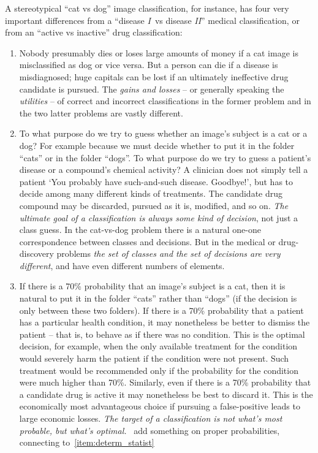 \documentclass[\ifafour a4paper,12pt,\else a5paper,10pt,\fi%
onecolumn,oneside,article,%
british%
]{memoir}
\theoremstyle{remark}
\theoremstyle{innote}
\newcommand*{\pencil}{{\fontencoding{U}\fontfamily{fontawesometwo}\selectfont\symbol{210}}}
\newcommand{\mynotep}[1]{{\footnotesize\color{notecolour}\pencil\ #1}}
\renewcommand*{\|}[1][]{\nonscript\:#1\vert\nonscript\:\mathopen{}}
\newcommand*{\tI}{\textit{I}}
\newcommand*{\tII}{\textit{II}}
\begin{document}
A stereotypical \enquote{cat vs dog} image classification, for instance, has four very important differences from a \enquote{disease \tI\ vs disease \tII} medical classification, or from an \enquote{active vs inactive} drug classification:
\begin{enumerate}[label=(\roman*),wide]

\item\label{item:gain_loss}Nobody presumably dies or loses large amounts of money if a cat image is misclassified as dog or vice versa. But a person can die if a disease is misdiagnosed; huge capitals can be lost if an ultimately ineffective drug candidate is pursued. The \emph{gains and losses} -- or generally speaking the \emph{utilities} -- of correct and incorrect classifications in the former problem and in the two latter problems are vastly different.

\item\label{item:decisions_classes} To what purpose do we try to guess whether an image's subject is a cat or a dog? For example because we must decide whether to put it in the folder \enquote{cats} or in the folder \enquote{dogs}. To what purpose do we try to guess a patient's disease or a compound's chemical activity? A clinician does not simply tell a patient \enquote*{You probably have such-and-such disease. Goodbye!}, but has to decide among many different kinds of treatments. The candidate drug compound may be discarded, pursued as it is, modified, and so on. \emph{The ultimate goal of a classification is always some kind of decision}, not just a class guess. In the cat-vs-dog problem there is a natural one-one correspondence between classes and decisions. But in the medical or drug-discovery problems \emph{the set of classes and the set of decisions are very different}, and have even different numbers of elements.

\item\label{item:optimal_truth} If there is a 70\% probability that an image's subject is a cat, then it is natural to put it in the folder \enquote{cats} rather than \enquote{dogs} (if the decision is only between these two folders). If there is a 70\% probability that a patient has a particular health condition, it may nonetheless be better to dismiss the patient -- that is, to behave as if there was no condition. This is the optimal decision, for example, when the only available treatment for the condition would severely harm the patient if the condition were not present. Such treatment would be recommended only if the probability for the condition were much higher than 70\%. Similarly, even if there is a 70\% probability that a candidate drug is active it may nonetheless be best to discard it. This is the economically most advantageous choice if pursuing a false-positive leads to large economic losses. \emph{The target of a classification is not what’s most probable, but what’s optimal.} \mynotep{add something on proper probabilities, connecting to~\ref{item:determ_statist}}


\end{enumerate}
\end{document}
